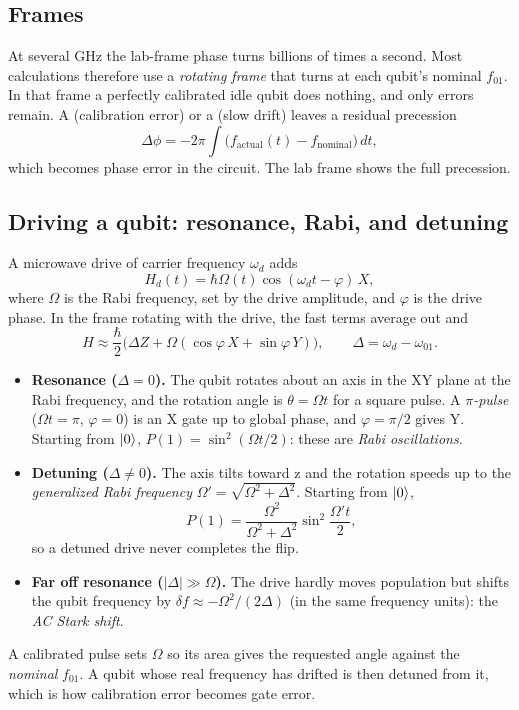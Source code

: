 \subsection{Frames}

At several GHz the lab-frame phase turns billions of times a second. Most
calculations therefore use a \emph{rotating frame} that turns at each qubit's
nominal $f_{01}$. In that frame a perfectly calibrated idle qubit does
nothing, and only errors remain. A  (calibration error)
or a  (slow drift) leaves a residual precession
\[
\Delta\phi=-2\pi\!\int\!\bigl(f_{\mathrm{actual}}(t)-f_{\mathrm{nominal}}\bigr)\,dt,
\]
which becomes phase error in the circuit. The lab frame shows the full
precession.

\subsection{Driving a qubit: resonance, Rabi, and detuning}

A microwave drive of carrier frequency $\omega_d$ adds
\[
H_d(t)=\hbar\Omega(t)\cos(\omega_d t-\varphi)\,X,
\]
where $\Omega$ is the Rabi frequency, set by the drive amplitude, and $\varphi$
is the drive phase. In the frame rotating with the drive, the fast terms
average out and
\[
H\approx\frac{\hbar}{2}\bigl(\Delta Z+\Omega(\cos\varphi\,X+\sin\varphi\,Y)\bigr),
\qquad \Delta=\omega_d-\omega_{01}.
\]
\begin{itemize}
  \item \textbf{Resonance ($\Delta=0$).} The qubit rotates about an axis in
  the XY plane at the Rabi frequency, and the rotation angle is
  $\theta=\Omega t$ for a square pulse. A \emph{$\pi$-pulse}
  ($\Omega t=\pi$, $\varphi=0$) is an X gate up to global phase, and
  $\varphi=\pi/2$ gives Y. Starting from $\lvert 0\rangle$, $P(1)=\sin^2(\Omega t/2)$:
  these are \emph{Rabi oscillations}.
  \item \textbf{Detuning ($\Delta\neq0$).} The axis tilts toward z and the
  rotation speeds up to the \emph{generalized Rabi frequency}
  $\Omega'=\sqrt{\Omega^2+\Delta^2}$. Starting from $\lvert 0\rangle$,
  \[
  P(1)=\frac{\Omega^2}{\Omega^2+\Delta^2}\sin^2\!\frac{\Omega' t}{2},
  \]
  so a detuned drive never completes the flip.
  \item \textbf{Far off resonance ($|\Delta|\gg\Omega$).} The drive hardly
  moves population but shifts the qubit frequency by
  $\delta f\approx-\Omega^2/(2\Delta)$ (in the same frequency units): the
  \emph{AC Stark shift}.
\end{itemize}
A calibrated pulse sets $\Omega$ so its area gives the requested angle
against the \emph{nominal} $f_{01}$. A qubit whose real frequency has drifted
is then detuned from it, which is how calibration error becomes gate error.

